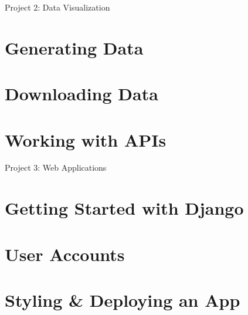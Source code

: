 \documentclass[oneside]{book}
\numberwithin{equation}{section}
\begin{document}

\begin{center}
	\Large Project 2: Data Visualization
\end{center}

\section{Generating Data}


\section{Downloading Data}


\section{Working with APIs}


\begin{center}
	\Large Project 3: Web Applications
\end{center}

\section{Getting Started with Django}


\section{User Accounts}


\section{Styling \& Deploying an App}

\end{document}
